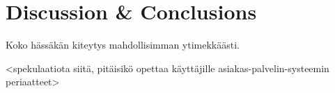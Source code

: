 
 \chapter{Discussion & Conclusions}
 Koko hässäkän kiteytys mahdollisimman ytimekkäästi.

 <spekulaatiota siitä, pitäisikö opettaa käyttäjille asiakas-palvelin-systeemin periaatteet>

 

 



